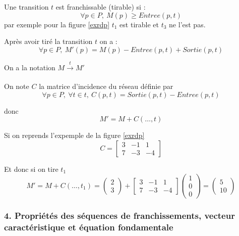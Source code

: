 \documentclass[12pt,a4paper,oneside]{article}
\begin{document}
	Une transition $t$ est franchissable (tirable) si :
	$$\forall p \in P,\ M(p) \geq Entree(p,t)$$
	par exemple pour la figure \ref{exrdp} $t_1$ est tirable et $t_3$ ne l'est pas.

	Après avoir tiré la transition $t$ on a :
	$$\forall p \in P,\ M'(p) = M(p) - Entree(p,t) + Sortie(p,t)$$

	On a la notation $M \xrightarrow[]{t} M'$

	On note $C$ la matrice d'incidence du réseau définie par
	$$\forall p \in P,\ \forall t \in t,\ C(p,t) = Sortie(p,t) - Entree(p,t)$$

	donc
	$$M' = M + C(\dots,t)$$

	Si on reprends l'expemple de la figure \ref{exrdp}
	$$C = \begin{bmatrix}
		3 & -1 & 1 \\
		7 & -3 & -4
	\end{bmatrix}$$

	Et donc si on tire $t_1$
	$$M' = M + C(\dots,t_1) =
	\begin{pmatrix}
		2\\
		3
	\end{pmatrix}
	+
	\begin{bmatrix}
		3 & -1 & 1 \\
		7 & -3 & -4
	\end{bmatrix}
	\begin{pmatrix}
		1\\
		0\\
		0
	\end{pmatrix}
	=
	\begin{pmatrix}
		5\\
		10
	\end{pmatrix}
	$$

\subsubsection*{4. Propriétés des séquences de franchissements, vecteur caractéristique et équation fondamentale}
\end{document}
